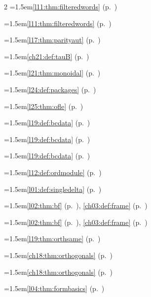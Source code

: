 \begin{multicols}{2}
\hangindent=1.5em\quad \ref{l11:thm:filteredwords} (p.~\pageref{l11:thm:filteredwords})\par
\hangindent=1.5em\quad \ref{l11:thm:filteredwords} (p.~\pageref{l11:thm:filteredwords})\par
\hangindent=1.5em\quad \ref{l17:thm:parityaut} (p.~\pageref{l17:thm:parityaut})\par
\hangindent=1.5em\quad \ref{ch21:def:tauB} (p.~\pageref{ch21:def:tauB})\par
\hangindent=1.5em\quad \ref{l21:thm:monoidal} (p.~\pageref{l21:thm:monoidal})\par
\hangindent=1.5em\quad \ref{l24:def:packages} (p.~\pageref{l24:def:packages})\par
\hangindent=1.5em\quad \ref{l25:thm:ofle} (p.~\pageref{l25:thm:ofle})\par
\hangindent=1.5em\quad \ref{l19:def:bcdata} (p.~\pageref{l19:def:bcdata})\par
\hangindent=1.5em\quad \ref{l19:def:bcdata} (p.~\pageref{l19:def:bcdata})\par
\hangindent=1.5em\quad \ref{l19:def:bcdata} (p.~\pageref{l19:def:bcdata})\par
\hangindent=1.5em\quad \ref{l12:def:ordmodule} (p.~\pageref{l12:def:ordmodule})\par
\hangindent=1.5em\quad \ref{l01:def:singledelta} (p.~\pageref{l01:def:singledelta})\par
\hangindent=1.5em\quad \ref{l02:thm:bf} (p.~\pageref{l02:thm:bf}), \ref{ch03:def:frame} (p.~\pageref{ch03:def:frame})\par
\hangindent=1.5em\quad \ref{l02:thm:bf} (p.~\pageref{l02:thm:bf}), \ref{ch03:def:frame} (p.~\pageref{ch03:def:frame})\par
\hangindent=1.5em\quad \ref{l19:thm:orthsame} (p.~\pageref{l19:thm:orthsame})\par
\hangindent=1.5em\quad \ref{ch18:thm:orthogonals} (p.~\pageref{ch18:thm:orthogonals})\par
\hangindent=1.5em\quad \ref{ch18:thm:orthogonals} (p.~\pageref{ch18:thm:orthogonals})\par
\hangindent=1.5em\quad \ref{l04:thm:formbasics} (p.~\pageref{l04:thm:formbasics})\par

\end{multicols}
